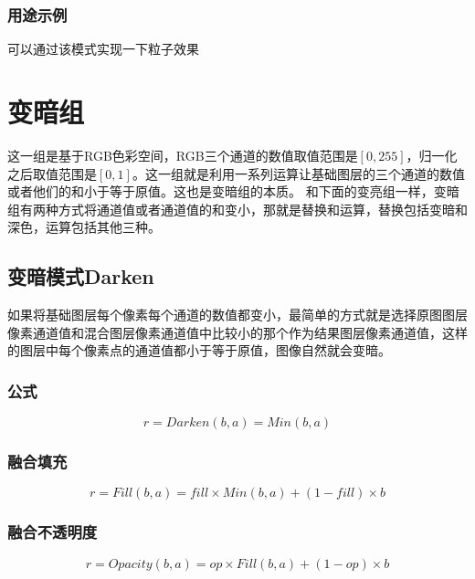 \subsection{ 用途示例}

可以通过该模式实现一下粒子效果

\chapter{变暗组}
\begin{introduction}
	\item 这一组是基于RGB色彩空间，RGB三个通道的数值取值范围是$[0,255]$，归一化之后取值范围是$[0,1]$。这一组就是利用一系列运算让基础图层的三个通道的数值或者他们的和小于等于原值。这也是变暗组的本质。
	和下面的变亮组一样，变暗组有两种方式将通道值或者通道值的和变小，那就是替换和运算，替换包括变暗和深色，运算包括其他三种。
\end{introduction}


\section{ 变暗模式Darken}

如果将基础图层每个像素每个通道的数值都变小，最简单的方式就是选择原图图层像素通道值和混合图层像素通道值中比较小的那个作为结果图层像素通道值，这样的图层中每个像素点的通道值都小于等于原值，图像自然就会变暗。

\subsection{ 公式}


\begin{equation}r=Darken(b,a)=Min(b,a)\end{equation}

\subsection{ 融合填充}
\begin{equation}r= Fill(b,a) =fill\times Min(b,a)+(1-fill)\times b\end{equation}
\subsection{ 融合不透明度}
\begin{equation}r=Opacity(b,a)=op\times Fill(b,a)+(1-op)\times b\end{equation}
